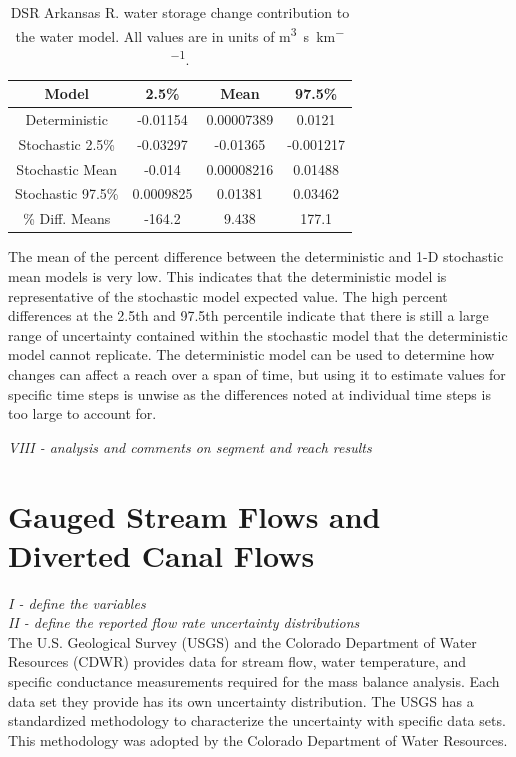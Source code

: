 \begin{linenumbers}
\begin{table}[htbp]
\centering
\caption[DSR Arkansas R. water storage change contribution to the water model.]{DSR Arkansas R. water storage change contribution to the water model.  All values are in units of \si{\cubic\meter\per\second\per\kilo\meter}.}
\label{tab:DSRWaterStore}
\begin{tabular}{c|ccc}
	\toprule
	Model& 2.5\% & Mean & 97.5\% \\
	\midrule
	\midrule
	Deterministic    &	-0.01154&	0.00007389&	0.0121\\
	\midrule                                               
	Stochastic 2.5\% &	-0.03297&	-0.01365&	-0.001217\\
	Stochastic Mean  &	-0.014&	0.00008216&	0.01488\\      
	Stochastic 97.5\%&	0.0009825&	0.01381&	0.03462\\  
	\midrule                                               
	\% Diff. Means&		-164.2&	9.438&	177.1\\
	\bottomrule
\end{tabular}
\end{table}

The mean of the percent difference between the deterministic and 1-D stochastic mean models is very low.  This indicates that the deterministic model is representative of the stochastic model expected value.  The high percent differences at the 2.5th and 97.5th percentile indicate that there is still a large range of uncertainty contained within the stochastic model that the deterministic model cannot replicate.  The deterministic model can be used to determine how changes can affect a reach over a span of time, but using it to estimate values for specific time steps is unwise as the differences noted at individual time steps is too large to account for.

\emph{VIII - analysis and comments on segment and reach results}\\

\clearpage{}
\section{Gauged Stream Flows and Diverted Canal Flows}
\label{sec:GaugedFlows}

\emph{I - define the variables}\\

\emph{II - define the reported flow rate uncertainty distributions}\\
The U.S. Geological Survey (USGS) and the Colorado Department of Water Resources (CDWR) provides data for stream flow, water temperature, and specific conductance measurements required for the mass balance analysis.  Each data set they provide has its own uncertainty distribution.  The USGS has a standardized methodology to characterize the uncertainty with specific data sets.  This methodology was adopted by the Colorado Department of Water Resources.


\end{linenumbers}
